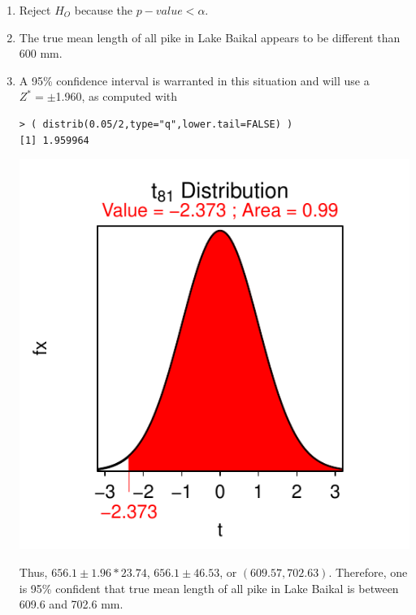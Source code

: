 \documentclass[10pt,openany]{book}\usepackage[]{graphicx}\usepackage[]{color}
\makeatletter
\newenvironment{kframe}{%
 \def\at@end@of@kframe{}%
 \ifinner\ifhmode%
  \def\at@end@of@kframe{\end{minipage}}%
  \begin{minipage}{\columnwidth}%
 \fi\fi%
 \def\FrameCommand##1{\hskip\@totalleftmargin \hskip-\fboxsep
 \colorbox{shadecolor}{##1}\hskip-\fboxsep
     \hskip-\linewidth \hskip-\@totalleftmargin \hskip\columnwidth}%
 \MakeFramed {\advance\hsize-\width
   \@totalleftmargin\z@ \linewidth\hsize
   \@setminipage}}%
 {\par\unskip\endMakeFramed%
 \at@end@of@kframe}
\newenvironment{knitrout}{}{} %
\makeatother
\begin{document}
\begin{itemize}
\begin{enumerate}
\begin{knitrout}
{}



\end{knitrout}
      \item Reject $H_{O}$ because the $p-value<\alpha$.
      \item The true mean length of all pike in Lake Baikal appears to be different than 600 mm.
      \item A 95\% confidence interval is warranted in this situation and will use a $Z^{*}=\pm$1.960, as computed with
\begin{knitrout}
\color{fgcolor}\begin{kframe}
\begin{verbatim}
> ( distrib(0.05/2,type="q",lower.tail=FALSE) )
[1] 1.959964
\end{verbatim}
\end{kframe}

{\centering \includegraphics[width=.4\linewidth]{Figs/unnamed-chunk-357-1} 

}



\end{knitrout}
Thus, $656.1\pm1.96*23.74$, $656.1\pm46.53$, or $(609.57, 702.63)$.  Therefore, one is 95\% confident that true mean length of all pike in Lake Baikal is between 609.6 and 702.6 mm.
    \end{enumerate}


\end{itemize}
\end{document}
